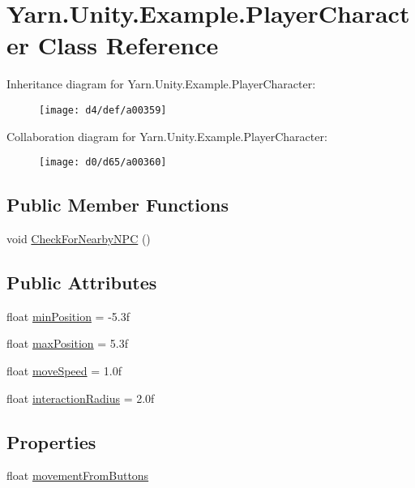 \hypertarget{a00065}{\section{Yarn.\-Unity.\-Example.\-Player\-Character Class Reference}
\label{a00065}
}


Inheritance diagram for Yarn.\-Unity.\-Example.\-Player\-Character\-:
\nopagebreak
\begin{figure}[H]
\begin{center}
\leavevmode
\texttt{[image: d4/def/a00359]}
\end{center}
\end{figure}


Collaboration diagram for Yarn.\-Unity.\-Example.\-Player\-Character\-:
\nopagebreak
\begin{figure}[H]
\begin{center}
\leavevmode
\texttt{[image: d0/d65/a00360]}
\end{center}
\end{figure}
\subsection*{Public Member Functions}
\begin{DoxyCompactItemize}
\item 
void \hyperlink{a00065_a574b6d984b8671c7a780d3d10e040a9b}{Check\-For\-Nearby\-N\-P\-C} ()
\end{DoxyCompactItemize}
\subsection*{Public Attributes}
\begin{DoxyCompactItemize}
\item 
float \hyperlink{a00065_ac025d4f4afaf854f8256e0d2d03e5b52}{min\-Position} = -\/5.\-3f
\item 
float \hyperlink{a00065_ada9dd748a1d89a7f9b12ac8967a07ae6}{max\-Position} = 5.\-3f
\item 
float \hyperlink{a00065_adc602a4b2c7e44e4b15a11f1ffcf07e4}{move\-Speed} = 1.\-0f
\item 
float \hyperlink{a00065_af89807d2195915ee9a0c42317e110fc6}{interaction\-Radius} = 2.\-0f
\end{DoxyCompactItemize}
\subsection*{Properties}
\begin{DoxyCompactItemize}
\item 
float \hyperlink{a00065_a7bcde19f080bfd09bbc833b8fb555cf7}{movement\-From\-Buttons}
\end{DoxyCompactItemize}
